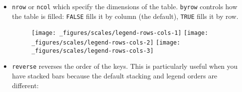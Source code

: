 \begin{itemize}
\item
  \texttt{nrow} or \texttt{ncol} which specify the dimensions of the
  table. \texttt{byrow} controls how the table is filled: \texttt{FALSE}
  fills it by column (the default), \texttt{TRUE} fills it by row.

\begin{Shaded}
\begin{Highlighting}[]
\StringTok{ }\NormalTok{(} \NormalTok{, } \OperatorTok{:}\NormalTok{, }\NormalTok{ letters[}\OperatorTok{:}\NormalTok{])}
\StringTok{ }\OperatorTok{+}\StringTok{ }\NormalTok{(}\NormalTok{(}
\OperatorTok{+}\StringTok{ }\NormalTok{(} \NormalTok{(} \NormalTok{))}
\OperatorTok{+}\StringTok{ }\NormalTok{(} \NormalTok{(} \NormalTok{, } \NormalTok{))}
\end{Highlighting}
\end{Shaded}

  \begin{figure}[H]
    \texttt{[image: \_figures/scales/legend-rows-cols-1]}%
    \texttt{[image: \_figures/scales/legend-rows-cols-2]}%
    \texttt{[image: \_figures/scales/legend-rows-cols-3]}
  \end{figure}
\item
  \texttt{reverse} reverses the order of the keys. This is particularly
  useful when you have stacked bars because the default stacking and
  legend orders are different:

\begin{Shaded}
\begin{Highlighting}[]
\StringTok{ }\NormalTok{(}\OperatorTok{+}\StringTok{ }\NormalTok{(} \NormalTok{, }\NormalTok{(}
\OperatorTok{+}\StringTok{ }\NormalTok{(} \NormalTok{(} \NormalTok{))}
\end{Highlighting}
\end{Shaded}


\end{itemize}
